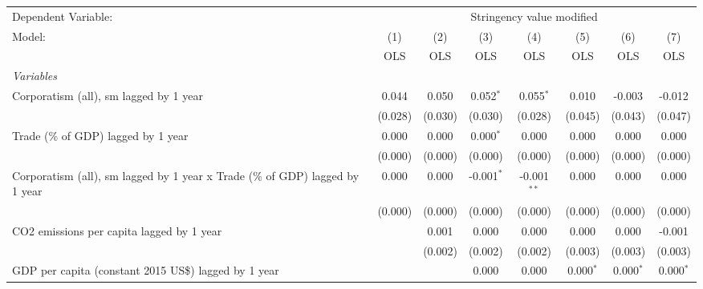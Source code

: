 
\begingroup
\centering
\begin{tabular}{lccccccc}
   \toprule
   Dependent Variable: & \multicolumn{7}{c}{Stringency value modified}\\
   Model:                                                                       & (1)     & (2)     & (3)          & (4)           & (5)         & (6)          & (7)\\  
                                                                                &  OLS    & OLS     & OLS          & OLS           & OLS         & OLS          & OLS\\  
   \midrule
   \emph{Variables}\\
   Corporatism (all), sm lagged by 1 year                                       & 0.044   & 0.050   & 0.052$^{*}$  & 0.055$^{*}$   & 0.010       & -0.003       & -0.012\\   
                                                                                & (0.028) & (0.030) & (0.030)      & (0.028)       & (0.045)     & (0.043)      & (0.047)\\   
   Trade (\% of GDP) lagged by 1 year                                           & 0.000   & 0.000   & 0.000$^{*}$  & 0.000         & 0.000       & 0.000        & 0.000\\   
                                                                                & (0.000) & (0.000) & (0.000)      & (0.000)       & (0.000)     & (0.000)      & (0.000)\\   
   Corporatism (all), sm lagged by 1 year x Trade (\% of GDP) lagged by 1 year  & 0.000   & 0.000   & -0.001$^{*}$ & -0.001$^{**}$ & 0.000       & 0.000        & 0.000\\   
                                                                                & (0.000) & (0.000) & (0.000)      & (0.000)       & (0.000)     & (0.000)      & (0.000)\\   
   CO2 emissions per capita lagged by 1 year                                    &         & 0.001   & 0.000        & 0.000         & 0.000       & 0.000        & -0.001\\   
                                                                                &         & (0.002) & (0.002)      & (0.002)       & (0.003)     & (0.003)      & (0.003)\\   
   GDP per capita (constant 2015 US\$) lagged by 1 year                         &         &         & 0.000        & 0.000         & 0.000$^{*}$ & 0.000$^{*}$  & 0.000$^{*}$\\   

\end{tabular}
